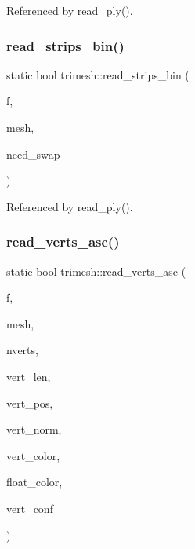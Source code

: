 Referenced by read\+\_\+ply().

\mbox{\label{namespacetrimesh_acf511fb9c7857f1814d633a7f782872c}} 
\subsubsection{\texorpdfstring{read\+\_\+strips\+\_\+bin()}{read\_strips\_bin()}}
{\footnotesize\ttfamily static bool trimesh\+::read\+\_\+strips\+\_\+bin (\begin{DoxyParamCaption}\item[{F\+I\+LE $\ast$}]{f,  }\item[{\hyperlink{classtrimesh_1_1TriMesh}{Tri\+Mesh} $\ast$}]{mesh,  }\item[{bool}]{need\+\_\+swap }\end{DoxyParamCaption})\hspace{0.3cm}{\ttfamily [static]}}



Referenced by read\+\_\+ply().

\mbox{\label{namespacetrimesh_abcd71712bff6c4ee8c3fc4627ed6a292}} 
\subsubsection{\texorpdfstring{read\+\_\+verts\+\_\+asc()}{read\_verts\_asc()}}
{\footnotesize\ttfamily static bool trimesh\+::read\+\_\+verts\+\_\+asc (\begin{DoxyParamCaption}\item[{F\+I\+LE $\ast$}]{f,  }\item[{\hyperlink{classtrimesh_1_1TriMesh}{Tri\+Mesh} $\ast$}]{mesh,  }\item[{int}]{nverts,  }\item[{int}]{vert\+\_\+len,  }\item[{int}]{vert\+\_\+pos,  }\item[{int}]{vert\+\_\+norm,  }\item[{int}]{vert\+\_\+color,  }\item[{bool}]{float\+\_\+color,  }\item[{int}]{vert\+\_\+conf }\end{DoxyParamCaption})\hspace{0.3cm}{\ttfamily [static]}}



